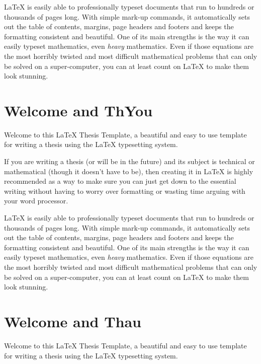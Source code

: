 \LaTeX{} is easily able to professionally typeset documents that run to hundreds or thousands of pages long. With simple mark-up commands, it automatically sets out the table of contents, margins, page headers and footers and keeps the formatting consistent and beautiful. One of its main strengths is the way it can easily typeset mathematics, even \emph{heavy} mathematics. Even if those equations are the most horribly twisted and most difficult mathematical problems that can only be solved on a super-computer, you can at least count on \LaTeX{} to make them look stunning.


\section{Welcome and ThYou}\label{sec:weome}
Welcome to this \LaTeX{} Thesis Template\parencite{Reference1}, a beautiful and easy to use template for writing a thesis using the \LaTeX{} typesetting system.

If you are writing a thesis (or will be in the future) and its subject is technical or mathematical (though it doesn't have to be), then creating it in \LaTeX{} is highly recommended as a way to make sure you can just get down to the essential writing without having to worry over formatting or wasting time arguing with your word processor.

\LaTeX{} is easily able to professionally typeset documents that run to hundreds or thousands of pages long. With simple mark-up commands, it automatically sets out the table of contents, margins, page headers and footers and keeps the formatting consistent and beautiful. One of its main strengths is the way it can easily typeset mathematics, even \emph{heavy} mathematics. Even if those equations are the most horribly twisted and most difficult mathematical problems that can only be solved on a super-computer, you can at least count on \LaTeX{} to make them look stunning.


\section{Welcome and Thau}\label{sec:welcoe}
Welcome to this \LaTeX{} Thesis Template, a beautiful and easy to use template for writing a thesis using the \LaTeX{} typesetting system.

